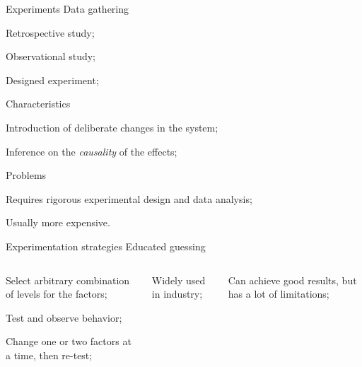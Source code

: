 \documentclass[t]{beamer}
\begin{document}

\begin{ftst}
{Experiments}
{Data gathering}
\begin{block}{}
	{\small\bitems Retrospective study;
		\item Observational study;
		\item \alert{Designed experiment};
	\eitem}
\end{block}
\begin{block}{Characteristics}
	{\small\bitems Introduction of deliberate changes in the system;
		\item Inference on the \textit{causality} of the effects;
		\eitem}
\end{block}
\begin{block}{Problems}
	{\small\bitems Requires rigorous experimental design and data analysis;
	\item Usually more expensive.
	\eitem}
\end{block}
\end{ftst}


\begin{ftst}
{Experimentation strategies}
{Educated guessing}
\vspace{-1em}
\begin{columns}[T]
	\begin{block}{}
		\bitems Select arbitrary combination of levels for the factors;
			\item Test and observe behavior; 
			\item Change one or two factors at a time, then re-test;
		\eitem
	\end{block}
\bitems Widely used in industry;
\item Can achieve good results, but has a lot of limitations;
\eitem
\end{columns}
\end{ftst}
\end{document}

